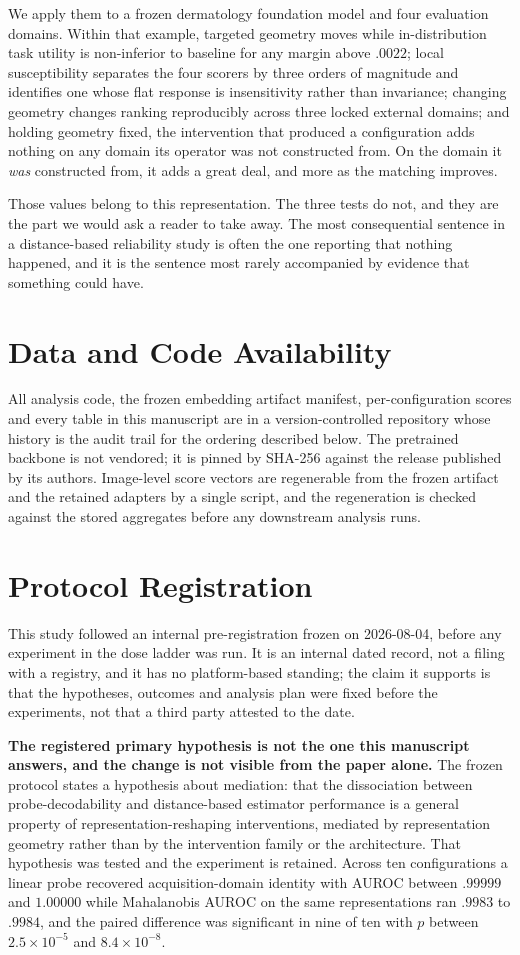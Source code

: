 \documentclass[11pt,a4paper]{article}
\begin{document}
We apply them to a frozen dermatology foundation model and four evaluation
domains. Within that example, targeted geometry moves while in-distribution
task utility is non-inferior to baseline for any margin above $.0022$; local
susceptibility separates the four scorers by three orders of magnitude and
identifies one whose flat response is insensitivity rather than invariance;
changing geometry changes ranking reproducibly across three locked external
domains; and holding geometry fixed, the intervention that produced a
configuration adds nothing on any domain its operator was not constructed from.
On the domain it \emph{was} constructed from, it adds a great deal, and more as
the matching improves.

Those values belong to this representation. The three tests do not, and they
are the part we would ask a reader to take away. The most consequential
sentence in a distance-based reliability study is often the one reporting that
nothing happened, and it is the sentence most rarely accompanied by evidence
that something could have.

\section*{Data and Code Availability}
All analysis code, the frozen embedding artifact manifest, per-configuration
scores and every table in this manuscript are in a version-controlled
repository whose history is the audit trail for the ordering described below.
The pretrained backbone is not vendored; it is pinned by SHA-256 against the
release published by its authors. Image-level score vectors are regenerable
from the frozen artifact and the retained adapters by a single script, and the
regeneration is checked against the stored aggregates before any downstream
analysis runs.

\section*{Protocol Registration}
This study followed an internal pre-registration frozen on 2026-08-04, before
any experiment in the dose ladder was run. It is an internal dated record, not
a filing with a registry, and it has no platform-based standing; the claim it
supports is that the hypotheses, outcomes and analysis plan were fixed before
the experiments, not that a third party attested to the date.

\textbf{The registered primary hypothesis is not the one this manuscript
answers, and the change is not visible from the paper alone.} The frozen
protocol states a hypothesis about mediation: that the dissociation between
probe-decodability and distance-based estimator performance is a general
property of representation-reshaping interventions, mediated by representation
geometry rather than by the intervention family or the architecture. That
hypothesis was tested and the experiment is retained. Across ten
configurations a linear probe recovered acquisition-domain identity with AUROC
between $.99999$ and $1.00000$ while Mahalanobis AUROC on the same
representations ran $.9983$ to $.9984$, and the paired difference was
significant in nine of ten with $p$ between $2.5\times10^{-5}$ and
$8.4\times10^{-8}$.
\end{document}
